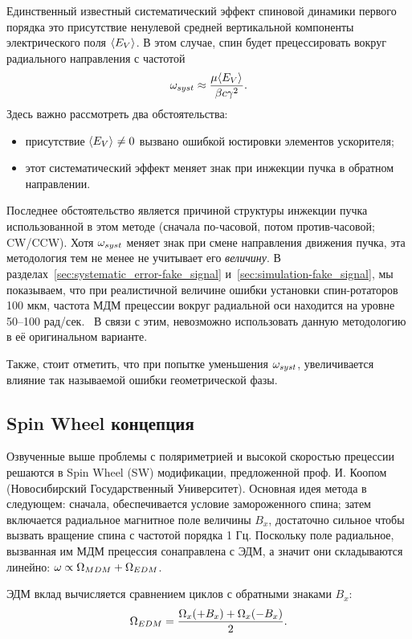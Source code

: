 Единственный известный систематический эффект спиновой динамики
первого порядка это присутствие ненулевой средней вертикальной
компоненты электрического поля $\avg{E_V}$. В этом случае, спин будет
прецессировать вокруг радиального направления с частотой~\cite[стр.~11]{BNL:Deuteron2008}
\[
\w_{syst} \approx \frac{\mu\avg{E_V}}{\beta c\gamma^2}.
\]
Здесь важно рассмотреть два обстоятельства:
\begin{itemize}
\item присутствие $\avg{E_V}\neq 0$ вызвано ошибкой юстировки
  элементов ускорителя;
\item этот систематический эффект меняет знак при инжекции пучка в
  обратном направлении.
\end{itemize}
Последнее обстоятельство является причиной структуры инжекции пучка
использованной в этом методе (сначала по-часовой, потом
против-часовой; CW/CCW). Хотя $\omega_{syst}$ меняет знак при смене
направления движения пучка, эта методология тем не менее не учитывает
его \emph{величину}. В разделах~\ref{sec:systematic_error-fake_signal} и~\ref{sec:simulation-fake_signal}, 
мы
показываем, что при реалистичной величине ошибки установки
спин-ротаторов 100 мкм, частота МДМ прецессии вокруг радиальной оси
находится на уровне 50--100 рад/сек.~\cite{Senichev:FDM} В связи с
этим, невозможно использовать данную методологию в её оригинальном варианте.

Также, стоит отметить, что при попытке уменьшения $\omega_{syst}$, увеличивается влияние
так называемой ошибки геометрической фазы.~\cite[стр.~6]{BNL:Proton}

\subsection{Spin Wheel концепция}
Озвученные выше проблемы с поляриметрией и высокой скоростью прецессии
решаются в Spin Wheel (SW) модификации, предложенной проф. И. Коопом
(Новосибирский Государственный Университет). Основная идея метода в
следующем: сначала, обеспечивается условие замороженного спина; затем
включается радиальное магнитное поле величины $B_x$, достаточно сильное чтобы
вызвать вращение спина с частотой порядка 1 Гц. Поскольку поле
радиальное, вызванная им МДМ прецессия сонаправлена с ЭДМ, а значит
они складываются линейно: $\omega \propto \Omega_{MDM} + \Omega_{EDM}$.

ЭДМ вклад вычисляется сравнением циклов с обратными знаками $B_x$:~\cite[стр.~1963]{Koop:IPAC13}
\[
\Omega_{EDM} = \frac{\Omega_x(+B_x) + \Omega_x(-B_x)}{2}.
\]

